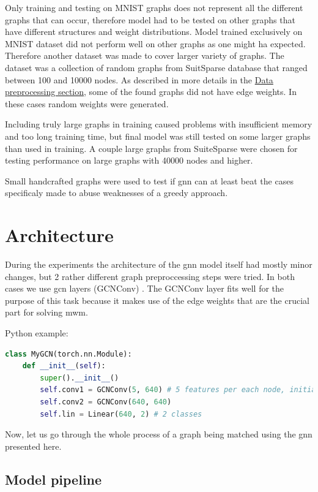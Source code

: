 Only training and testing on MNIST graphs does not represent all the different graphs that can occur, therefore model had to be tested on other graphs that have different structures and weight distributions. Model trained exclusively on MNIST dataset did not perform well on other graphs as one might ha expected. Therefore another dataset was made to cover larger variety of graphs. The dataset was a collection of random graphs from SuitSparse database that ranged between 100 and 10000 nodes. As described in more details in the \hyperref[sec:preprocessing]{Data preprocessing section}, some of the found graphs did not have edge weights. In these cases random weights were generated.

Including truly large graphs in training caused problems with insufficient memory and too long training time, but final model was still tested on some larger graphs than used in training. A couple large graphs from SuiteSparse were chosen for testing performance on large graphs with 40000 nodes and higher.

Small handcrafted graphs were used to test if \gls{gnn} can at least beat the cases specificaly made to abuse weaknesses of a greedy approach.

\section{Architecture}
\label{sec:architecture}
During the experiments the architecture of the \gls{gnn} model itself had mostly minor changes, but 2 rather different graph preproccessing steps were tried. In both cases we use \gls{gcn} layers (GCNConv) \cite{gcnpaper}. The GCNConv layer fits well for the purpose of this task because it makes use of the edge weights that are the crucial part for solving \gls{mwm}.

Python example:
\begin{lstlisting}[language=Python]
class MyGCN(torch.nn.Module):
    def __init__(self):
        super().__init__()
        self.conv1 = GCNConv(5, 640) # 5 features per each node, initialy 1
        self.conv2 = GCNConv(640, 640)
        self.lin = Linear(640, 2) # 2 classes 
\end{lstlisting}

Now, let us go through the whole process of a graph being matched using the \gls{gnn} presented here.

\subsection{Model pipeline}

